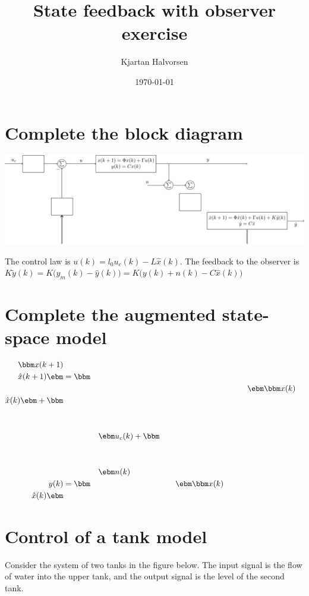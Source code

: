 \documentclass[letterpaper]{scrartcl}
\author{Kjartan Halvorsen}
\date{\today}
\title{State feedback with observer exercise}
\begin{document}
\maketitle

\section*{Complete the block diagram}
\label{sec-1}
\begin{center}
\includegraphics[width=\linewidth]{../figures/state-feedback-with-observer-incomplete}
\end{center}

The control law is \(u(k) = l_0u_c(k) - L\hat{x}(k)\). The feedback to the observer is \(K\tilde{y}(k) = K\big(y_m(k) - \hat{y}(k)\big) = K\big(y(k) + n(k) - C\hat{x}(k)\big) \) 


\section*{Complete the augmented state-space model}
\label{sec-2}

\begin{align*}
\bbm x(k+1)\\\hat{x}(k+1) \ebm &= \bbm & & & & & & & &&& & & &\\ &&& & & & & & & & & & &\ebm \bbm x(k)\\\hat{x}(k)\ebm + \bbm &&&\\&&&\\&&&\\&&& \ebm u_c(k) + \bbm &&&\\&&&\\&&&\\&&& \ebm n(k)\\
y(k) &= \bbm &&&&&& \ebm \bbm x(k)\\\hat{x}(k)\ebm
\end{align*}

\newpage

\section*{Control of a tank model}
\label{sec-3}
Consider the system of two tanks in the figure below. The input signal is the flow of water into the upper tank, and the output signal is the level of the second tank. 
\end{document}
